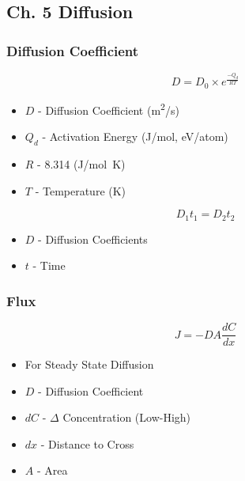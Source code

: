 	\subsection{Ch. 5 Diffusion}
		\subsubsection{Diffusion Coefficient}
			\begin{equation}
				D = D_{0} \times e^{\frac{-Q_{d}}{RT}}
			\end{equation}
			\begin{itemize}[noitemsep]
				\item $D$ - Diffusion Coefficient (\si{\meter \squared / \second})
				\item $Q_{d}$ - Activation Energy (\si{\joule / \mole}, \si{\electronvolt / atom})
				\item $R$ - 8.314 (\si{\joule / \mole \kelvin})
				\item $T$ - Temperature (\si{\kelvin})
			\end{itemize}
			\begin{equation}
				D_{1} t_{1} = D_{2} t_{2}
			\end{equation}
			\begin{itemize}[noitemsep]
				\item $D$ - Diffusion Coefficients
				\item $t$ - Time
			\end{itemize}
		
		\subsubsection{Flux}
			\begin{equation}
				J = -D A \frac{dC}{dx}
			\end{equation}
			\begin{itemize}[noitemsep]
				\item For Steady State Diffusion
				\item $D$ - Diffusion Coefficient
				\item $dC$ - $\Delta$ Concentration (Low-High)
				\item $dx$ - Distance to Cross
				\item $A$ - Area
			\end{itemize}
		
